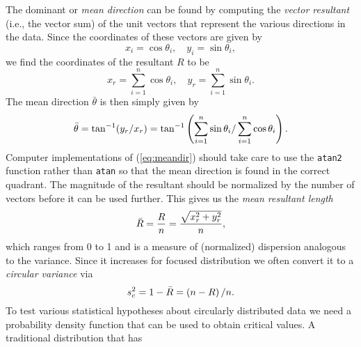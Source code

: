 The dominant or \emph{mean direction} can be found by computing the \emph{vector resultant} 
(i.e., the vector sum) of the unit vectors that represent the various directions in the data.  Since the 
coordinates of these vectors are given by
\begin{equation} 
x_{i}=\cos \theta_{i},\quad y_{i}=\sin \theta_{i},
\label{eq:xy_components}
\end{equation}	 	
we find the coordinates of the resultant $R$ to be
\begin{equation} 
x_{r}=\displaystyle \sum^{n}_{i=1} \cos \theta_{i}, \quad y_{r}=\displaystyle \sum^{n}_{i=1} \sin \theta_{i}.
\end{equation}	 	
The mean direction $\bar{\theta}$ is then simply given by
\begin{equation}
	\index{Mean direction}
	\index{Direction!mean}
\bar{\theta}= \tan^{-1}(y_{r}/x_{r})=\tan^{-1} \left(\sum^{n}_{i=1} \sin \theta_{i}/\sum^{n}_{i=1}\cos \theta_{i} \right).
\label{eq:meandir}
\end{equation}
Computer implementations of (\ref{eq:meandir}) should take care to use the \texttt{atan2} function rather than \texttt{atan}
so that the mean direction is found in the correct quadrant.
The magnitude of the resultant should be normalized by the number of vectors before it can be 
used further.  This gives us the \emph{mean resultant length}
\begin{equation}
	\index{Mean resultant length}
	\index{Vector!mean resultant length}
\bar{R} = \frac{R}{n} = \frac{\sqrt{x^2_r + y^2_r}}{n},
\end{equation}
which ranges from 0 to 1 and is a measure of (normalized) dispersion analogous 
to the variance.  Since it increases for focused distribution we often convert it to a
\emph{circular variance} via
\begin{equation}
	\index{Variance!circular}
s^{2}_{c}=1- \bar{R}= \left( n-R \right) / n.
\end{equation}
To test various statistical hypotheses about circularly distributed data we need a 
probability density function that can be used to obtain critical values.  A traditional distribution that has 
